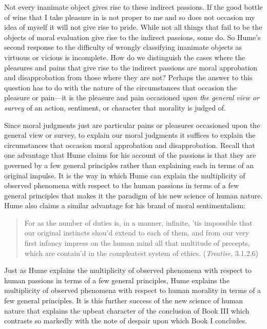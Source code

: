 Not every inanimate object gives rise to these indirect passions. If the good bottle of wine that I take pleasure in is not proper to me and so does not occasion my idea of myself it will not give rise to pride. While not all things that fail to be the objects of moral evaluation give rise to the indirect passions, some do. So Hume's second response to the difficulty of wrongly classifying inanimate objects as virtuous or vicious is incomplete. How do we distinguish the cases where the pleasures and pains that give rise to the indirect passions are moral approbation and disapprobation from those where they are not? Perhaps the answer to this question has to do with the nature of the circumstances that occasion the pleasure or pain---it is the pleasure and pain occasioned \emph{upon the general view or survey} of an action, sentiment, or character that morality is judged of.

Since moral judgments just are particular pains or pleasures occasioned upon the general view or survey, to explain our moral judgments it suffices to explain the circumstances that occasion moral approbation and disapprobation. Recall that one advantage that Hume claims for his account of the passions is that they are governed by a few general principles rather than explaining each in terms of an original impulse. It is the way in which Hume can explain the multiplicity of observed phenomena with respect to the human passions in terms of a few general principles that makes it the paradigm of his new science of human nature. Hume also claims a similar advantage for his brand of moral sentimentalism:

\begin{quote}
	For as the number of duties is, in a manner, infinite, 'tis impossible that our original instincts shou'd extend to each of them, and from our very first infancy impress on the human mind all that multitude of precepts, which are contain'd in the compleatest system of ethics. (\emph{Treatise}, 3.1.2.6)
\end{quote}

Just as Hume explains the multiplicity of observed phenomena with respect to human passions in terms of a few general principles, Hume explains the multiplicity of observed phenomena with respect to human morality in terms of a few general principles. It is this further success of the new science of human nature that explains the upbeat character of the conclusion of Book III which contrasts so markedly with the note of despair upon which Book I concludes. \change

